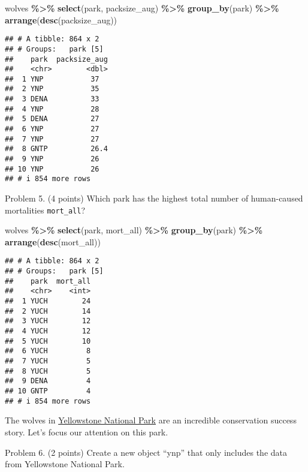 \documentclass[
]{article}
\newenvironment{Shaded}{\begin{snugshade}}{\end{snugshade}}
\newcommand{\FunctionTok}[1]{\textcolor[rgb]{0.13,0.29,0.53}{\textbf{#1}}}
\newcommand{\NormalTok}[1]{#1}
\newcommand{\SpecialCharTok}[1]{\textcolor[rgb]{0.81,0.36,0.00}{\textbf{#1}}}
\begin{document}
\begin{Shaded}
\begin{Highlighting}[]
\NormalTok{wolves }\SpecialCharTok{\%\textgreater{}\%} 
  \FunctionTok{select}\NormalTok{(park, packsize\_aug) }\SpecialCharTok{\%\textgreater{}\%} 
  \FunctionTok{group\_by}\NormalTok{(park) }\SpecialCharTok{\%\textgreater{}\%} 
  \FunctionTok{arrange}\NormalTok{(}\FunctionTok{desc}\NormalTok{(packsize\_aug))}
\end{Highlighting}
\end{Shaded}

\begin{verbatim}
## # A tibble: 864 x 2
## # Groups:   park [5]
##    park  packsize_aug
##    <chr>        <dbl>
##  1 YNP           37  
##  2 YNP           35  
##  3 DENA          33  
##  4 YNP           28  
##  5 DENA          27  
##  6 YNP           27  
##  7 YNP           27  
##  8 GNTP          26.4
##  9 YNP           26  
## 10 YNP           26  
## # i 854 more rows
\end{verbatim}

Problem 5. (4 points) Which park has the highest total number of
human-caused mortalities \texttt{mort\_all}?

\begin{Shaded}
\begin{Highlighting}[]
\NormalTok{wolves }\SpecialCharTok{\%\textgreater{}\%} 
  \FunctionTok{select}\NormalTok{(park, mort\_all) }\SpecialCharTok{\%\textgreater{}\%} 
  \FunctionTok{group\_by}\NormalTok{(park) }\SpecialCharTok{\%\textgreater{}\%} 
  \FunctionTok{arrange}\NormalTok{(}\FunctionTok{desc}\NormalTok{(mort\_all))}
\end{Highlighting}
\end{Shaded}

\begin{verbatim}
## # A tibble: 864 x 2
## # Groups:   park [5]
##    park  mort_all
##    <chr>    <int>
##  1 YUCH        24
##  2 YUCH        14
##  3 YUCH        12
##  4 YUCH        12
##  5 YUCH        10
##  6 YUCH         8
##  7 YUCH         5
##  8 YUCH         5
##  9 DENA         4
## 10 GNTP         4
## # i 854 more rows
\end{verbatim}

The wolves in
\href{https://www.nps.gov/yell/learn/nature/wolf-restoration.htm}{Yellowstone
National Park} are an incredible conservation success story. Let's focus
our attention on this park.

Problem 6. (2 points) Create a new object ``ynp'' that only includes the
data from Yellowstone National Park.
\end{document}
